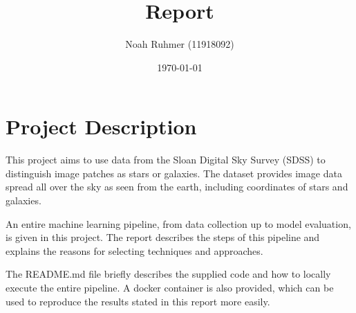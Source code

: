 \documentclass[
a4paper,     %
10pt         %
]{scrartcl}  %
\title{Report}
\author{Noah Ruhmer (11918092)}
\date{\today{}}
\begin{document}

 \maketitle







\newpage
\section{Project Description}
This project aims to use data from the Sloan Digital Sky Survey (SDSS) to distinguish image patches as stars or galaxies.
The dataset provides image data spread all over the sky as seen from the earth, including coordinates of stars and galaxies.

An entire machine learning pipeline, from data collection up to model evaluation, is given in this project.
The report describes the steps of this pipeline and explains the reasons for selecting techniques and approaches.

The README.md file briefly describes the supplied code and how to locally execute the entire pipeline.
A docker container is also provided, which can be used to reproduce the results stated in this report more easily.
\end{document}
